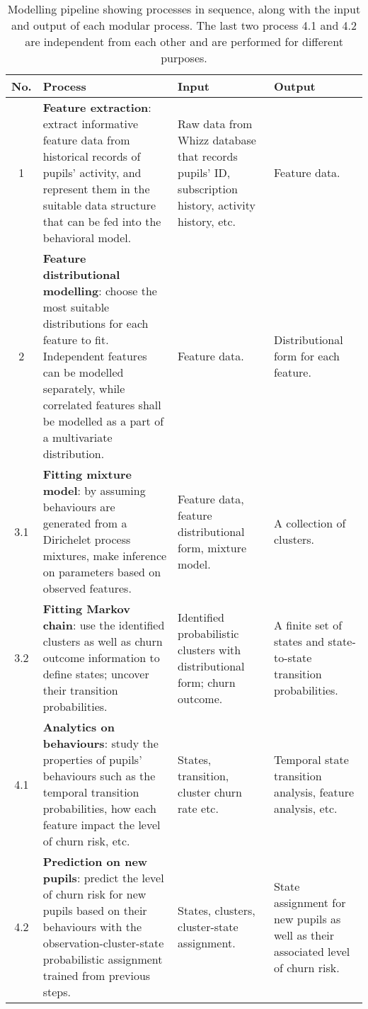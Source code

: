 \documentclass[english,a4,oneside,9pt]{extarticle}
\begin{document}
\begin{table}[htb]
\vspace*{-5mm}
\centering
\footnotesize
\begin{tabular}{c|p{5.5cm}|p{3cm}|p{2.5cm}}
\hline
\textbf{No.} & \textbf{Process} & \textbf{Input} & \textbf{Output} \\
\hline
1 &
\textbf{Feature extraction}: extract informative feature data from historical records of pupils' activity, and represent them in the suitable data structure that can be fed into the behavioral model.&
Raw data from Whizz database that records pupils' ID, subscription history, activity history, etc. & 
Feature data. \\
\hline
2 &
\textbf{Feature distributional modelling}: choose the most suitable distributions for each feature to fit. Independent features can be modelled separately, while correlated features shall be modelled as a part of a multivariate distribution. &
Feature data. & 
Distributional form for each feature. \\
\hline
3.1 &
\textbf{Fitting mixture model}: by assuming behaviours are generated from a Dirichelet process mixtures, make inference on parameters based on observed features.&
Feature data, feature distributional form, mixture model.& 
A collection of clusters. \\
\hline
3.2 &
\textbf{Fitting Markov chain}: use the identified clusters as well as churn outcome information to define states; uncover their transition probabilities. &
Identified probabilistic clusters with distributional form; churn outcome. & 
A finite set of states and state-to-state transition probabilities. \\
\hline
4.1 &
\textbf{Analytics on behaviours}: study the properties of pupils' behaviours such as the temporal transition probabilities, how each feature impact the level of churn risk, etc. &
States, transition, cluster churn rate etc. & 
Temporal state transition analysis, feature analysis, etc. \\
\hline
4.2 &
\textbf{Prediction on new pupils}: predict the level of churn risk for new pupils based on their behaviours with the observation-cluster-state probabilistic assignment trained from previous steps. &
States, clusters, cluster-state assignment. & 
State assignment for new pupils as well as their associated level of churn risk. \\
\hline
\end{tabular}
\caption{Modelling pipeline showing processes in sequence, along with the input and output of each modular process. The last two process 4.1 and 4.2 are independent from each other and are performed for different purposes.}
\label{tab:pipeline}
\end{table}
\end{document}
